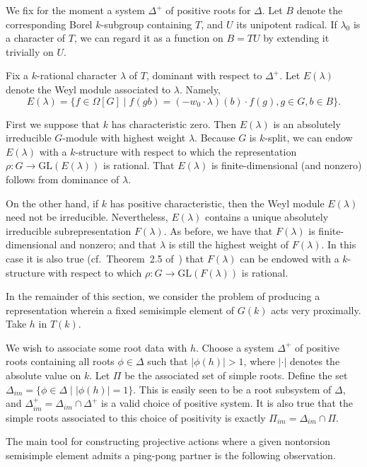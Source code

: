 \documentclass{amsart}
\theoremstyle{plain}
\theoremstyle{definition}
\theoremstyle{remark}
\providecommand{\abs}[1]{\lvert#1\rvert}
\begin{document}
We fix for the moment a system
$\Delta^{+}$ of positive roots for $\Delta$. Let $B$ denote the corresponding Borel
$k$-subgroup containing $T$, and $U$ its unipotent radical. If
$\lambda_{0}$ is a character of $T$, we can regard it as a function on $B = TU$ by
extending it trivially on $U$.

Fix a $k$-rational character $\lambda$ of $T$, dominant with respect to $\Delta^{+}$.
 Let $E(\lambda)$ denote the Weyl module
associated to $\lambda$. Namely,
$$E(\lambda) = \{f \in \Omega[G] \mid f(gb) = (-w_{0} \cdot \lambda)(b)\cdot f(g), g \in G, b
\in B\}.$$

First we suppose that $k$ has characteristic zero. Then $E(\lambda)$ is an absolutely irreducible $G$-module with highest
weight $\lambda$.
Because $G$ is $k$-split, we can endow $E(\lambda)$ with a $k$-structure with respect to
which the representation $\rho: G \to \mathrm{GL}(E(\lambda))$
is rational. That $E(\lambda)$ is finite-dimensional (and
nonzero) follows from dominance of $\lambda$.

On the other hand, if $k$ has positive characteristic, then the Weyl module $E(\lambda)$
need not be irreducible. Nevertheless, $E(\lambda)$ contains a unique absolutely
irreducible subrepresentation $F(\lambda)$. As before, we have that $F(\lambda)$ is
finite-dimensional and nonzero; and that $\lambda$ is still the highest weight of
$F(\lambda)$. In this case it is also true (cf.\ Theorem~2.5 of~\cite{MR0277536})
that $F(\lambda)$
can be endowed with a $k$-structure with respect to which $\rho:G \to \mathrm{GL}(F(\lambda))$
is rational.

In the remainder of this section, we consider the
problem of producing a representation wherein a fixed
semisimple element of $G(k)$ acts very proximally. Take $h$ in $T(k)$.

We wish to associate some root data with $h$. Choose a system $\Delta^{+}$ of positive
roots containing all roots $\phi \in \Delta$ such that $\abs{\phi(h)} > 1$, where
$\abs{\cdot}$ denotes the absolute value on $k$. Let $\Pi$ be the associated set of
simple
roots. Define the set $\Delta_{im} = \lbrace \phi \in \Delta \mid \abs{\phi(h)}
= 1\rbrace$. This is easily seen to be a root subsystem of $\Delta$, and
$\Delta_{im}^{+} = \Delta_{im} \cap \Delta^{+}$ is a valid choice of positive system.
It is also true that the simple roots associated to this choice of positivity is exactly
$\Pi_{im} = \Delta_{im} \cap \Pi$.

The main tool for constructing projective actions where a given nontorsion semi\-simple
element admits a ping-pong partner is the following observation.
\end{document}
